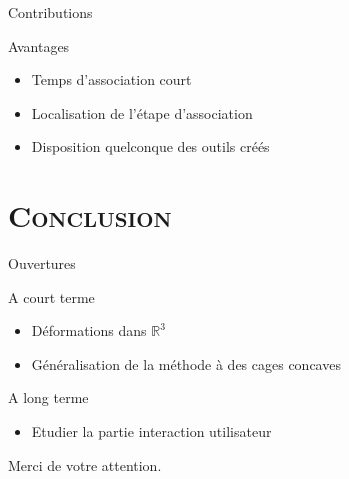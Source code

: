 \documentclass[xcolor=x11names,compress]{beamer}
\renewcommand{\(}{\begin{columns}} \renewcommand{\)}{\end{columns}}
\newcommand{\<}[1]{\begin{column}{#1}} \renewcommand{\>}{\end{column}}
\begin{document}
\begin{frame}{Contributions}
  \begin{exampleblock}{Avantages}
    \begin{itemize}
      \item Temps d'association court
      \item Localisation de l'étape d'association
      \item Disposition quelconque des outils créés
    \end{itemize}
  \end{exampleblock}
\end{frame}


\section{\scshape Conclusion}

\begin{frame}{Ouvertures}
  \begin{block}{A court terme}
    \begin{itemize}
      \item Déformations dans $\mathbb{R}^3$
      \item Généralisation de la méthode à des cages concaves
    \end{itemize}
  \end{block}
  \begin{block}{A long terme}
    \begin{itemize}
      \item Etudier la partie interaction utilisateur
    \end{itemize}
  \end{block}
\end{frame}

\begin{frame}{}
\begin{center}
\huge Merci de votre attention.
\end{center}
\end{frame}

\appendix
\end{document}
